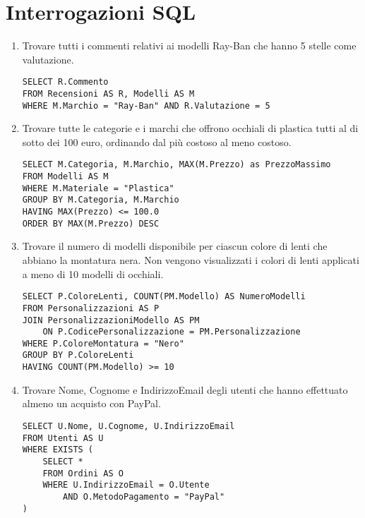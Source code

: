 \section{Interrogazioni SQL}

\begin{enumerate}[label=\Alph*.]
	\item Trovare tutti i commenti relativi ai modelli Ray-Ban che hanno 5 stelle come valutazione.
	      \begin{verbatim}
SELECT R.Commento
FROM Recensioni AS R, Modelli AS M
WHERE M.Marchio = "Ray-Ban" AND R.Valutazione = 5
	\end{verbatim}
	\item Trovare tutte le categorie e i marchi che offrono occhiali di plastica tutti al di sotto
	      dei 100 euro, ordinando dal più costoso al meno costoso.
	      \begin{verbatim}
SELECT M.Categoria, M.Marchio, MAX(M.Prezzo) as PrezzoMassimo
FROM Modelli AS M
WHERE M.Materiale = "Plastica"
GROUP BY M.Categoria, M.Marchio
HAVING MAX(Prezzo) <= 100.0
ORDER BY MAX(M.Prezzo) DESC
\end{verbatim}
	\item Trovare il numero di modelli disponibile per ciascun colore di lenti che abbiano la
	      montatura nera. Non vengono visualizzati i colori di lenti applicati a meno di 10
	      modelli di occhiali.
	      \begin{verbatim}
SELECT P.ColoreLenti, COUNT(PM.Modello) AS NumeroModelli
FROM Personalizzazioni AS P
JOIN PersonalizzazioniModello AS PM 
	ON P.CodicePersonalizzazione = PM.Personalizzazione
WHERE P.ColoreMontatura = "Nero"
GROUP BY P.ColoreLenti
HAVING COUNT(PM.Modello) >= 10
		  \end{verbatim}
	\item Trovare Nome, Cognome e IndirizzoEmail degli utenti che hanno effettuato almeno un
	      acquisto con PayPal.
	      \begin{verbatim}
SELECT U.Nome, U.Cognome, U.IndirizzoEmail
FROM Utenti AS U
WHERE EXISTS (
	SELECT *
	FROM Ordini AS O
	WHERE U.IndirizzoEmail = O.Utente
		AND O.MetodoPagamento = "PayPal"
)
	\end{verbatim}
\end{enumerate}
